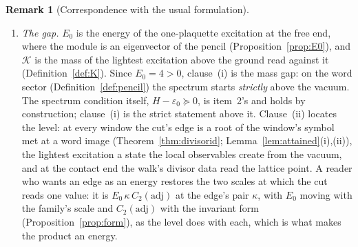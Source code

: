 \documentclass[11pt]{article}
\theoremstyle{definition}
\newtheorem{remark}{Remark}
\begin{document}
\begin{remark}[Correspondence with the usual formulation]
\begin{enumerate}[leftmargin=2em,itemsep=3pt]
\item \emph{The gap.} $E_0$ is the energy of the one-plaquette excitation at the
free end, where the module is an eigenvector of the pencil
(Proposition~\ref{prop:E0}), and $\mathcal K$ is the mass of the lightest
excitation above the ground read against it (Definition~\ref{def:K}). Since
$E_0=4>0$, clause~(i) is the mass gap: on the word sector
(Definition~\ref{def:pencil}) the spectrum starts \emph{strictly} above the
vacuum. The spectrum condition itself, $H-\varepsilon_0
\succeq0$, is item~2's and holds by construction; clause~(i) is the strict
statement above it. Clause~(ii) locates the level: at every window
the cut's edge is a root of the window's symbol met at a word image
(Theorem~\ref{thm:divisorid}; Lemma~\ref{lem:attained}(i),(ii)), the
lightest excitation a state the local observables create from the
vacuum, and at the contact end the walk's divisor data read the
lattice point. A reader who wants an edge as an energy restores the
two scales at which the cut reads one value: it is
$E_0\,\kappa\,C_2(\mathrm{adj})$ at the edge's pair $\kappa$, with
$E_0$ moving with the family's scale and $C_2(\mathrm{adj})$ with
the invariant form (Proposition~\ref{prop:form}), as the level does
with each, which is what makes the product an energy.


\end{enumerate}
\end{remark}
\end{document}
